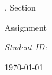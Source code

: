 \ifx\HWTITLEDEF\undefined

\newcommand{\HWTITLEDEF}{}

\ifx\CROWDMARK\undefined

\ifx\assignmenttitle\undefined
\newcommand{\assignmenttitle}{Assignment \assignmentnum}
\fi

\begin{titlepage}
\centering

\vspace*{4.5cm}

\ifx\hwtitlelarge\undefined
\newcommand{\hwtitlelarge}{
\coursename
\ifdefined\coursesec
, Section \coursesec
\fi
\vspace{0.5cm}

\assignmenttitle
}
\fi

{\Large 
\hwtitlelarge
}

\vspace{1cm}
        
\textit{\studentname}

\vspace{.5cm}
\textit{Student ID: \studentid}
\vspace{1.5cm}

\today

\end{titlepage}

\let\hwtitlelarge\undefined
   
\fi
\fi